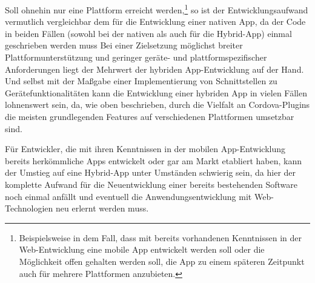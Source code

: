 Soll ohnehin nur eine Plattform erreicht werden,\footnote{Beispielsweise in dem Fall, dass mit bereits vorhandenen Kenntnissen in der Web-Entwicklung eine mobile App entwickelt werden soll oder die Möglichkeit offen gehalten werden soll, die App zu einem späteren Zeitpunkt auch für mehrere Plattformen anzubieten.} so ist der Entwicklungsaufwand vermutlich vergleichbar dem für die Entwicklung einer nativen App, da der Code in beiden Fällen (sowohl bei der nativen als auch für die Hybrid-App) einmal geschrieben werden muss %
Bei einer Zielsetzung möglichst breiter Plattformunterstützung und geringer geräte- und plattformspezifischer Anforderungen liegt der Mehrwert der hybriden App-Entwicklung auf der Hand.
Und selbst mit der Maßgabe einer Implementierung von Schnittstellen zu Gerätefunktionalitäten kann die Entwicklung einer hybriden App in vielen Fällen lohnenswert sein, da, wie oben beschrieben, durch die Vielfalt an Cordova-Plugins die meisten grundlegenden Features auf verschiedenen Plattformen umsetzbar sind. 


Für Entwickler, die mit ihren Kenntnissen in der mobilen App-Entwicklung bereits herkömmliche Apps entwickelt oder gar am Markt etabliert haben, kann der Umstieg auf eine Hybrid-App unter Umständen schwierig sein, da hier der komplette Aufwand für die Neuentwicklung einer bereits bestehenden Software noch einmal anfällt und eventuell die Anwendungsentwicklung mit Web-Technologien neu erlernt werden muss.





